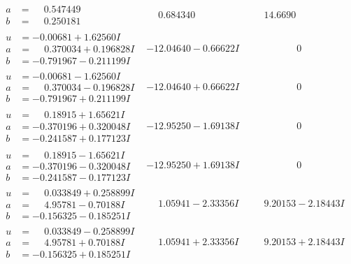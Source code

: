 \documentclass[1p]{elsarticle_modified}
\theoremstyle{definition}
\begin{document}
$$\begin{array}{c|c|c}
\begin{aligned}
a &= \phantom{-}0.547449\phantom{ +0.000000I} \\
b &= \phantom{-}0.250181\phantom{ +0.000000I}\end{aligned}
 & \phantom{-}0.684340\phantom{ +0.000000I} & \phantom{-}14.6690\phantom{ +0.000000I} \\ \hline\begin{aligned}
u &= -0.00681 + 1.62560 I \\
a &= \phantom{-}0.370034 + 0.196828 I \\
b &= -0.791967 - 0.211199 I\end{aligned}
 & -12.04640 - 0.66622 I & \phantom{-0.000000 } 0 \\ \hline\begin{aligned}
u &= -0.00681 - 1.62560 I \\
a &= \phantom{-}0.370034 - 0.196828 I \\
b &= -0.791967 + 0.211199 I\end{aligned}
 & -12.04640 + 0.66622 I & \phantom{-0.000000 } 0 \\ \hline\begin{aligned}
u &= \phantom{-}0.18915 + 1.65621 I \\
a &= -0.370196 + 0.320048 I \\
b &= -0.241587 + 0.177123 I\end{aligned}
 & -12.95250 - 1.69138 I & \phantom{-0.000000 } 0 \\ \hline\begin{aligned}
u &= \phantom{-}0.18915 - 1.65621 I \\
a &= -0.370196 - 0.320048 I \\
b &= -0.241587 - 0.177123 I\end{aligned}
 & -12.95250 + 1.69138 I & \phantom{-0.000000 } 0 \\ \hline\begin{aligned}
u &= \phantom{-}0.033849 + 0.258899 I \\
a &= \phantom{-}4.95781 - 0.70188 I \\
b &= -0.156325 - 0.185251 I\end{aligned}
 & \phantom{-}1.05941 - 2.33356 I & \phantom{-}9.20153 - 2.18443 I \\ \hline\begin{aligned}
u &= \phantom{-}0.033849 - 0.258899 I \\
a &= \phantom{-}4.95781 + 0.70188 I \\
b &= -0.156325 + 0.185251 I\end{aligned}
 & \phantom{-}1.05941 + 2.33356 I & \phantom{-}9.20153 + 2.18443 I \\ \hline\begin{aligned}

\end{aligned}
\end{array}$$
\end{document}
